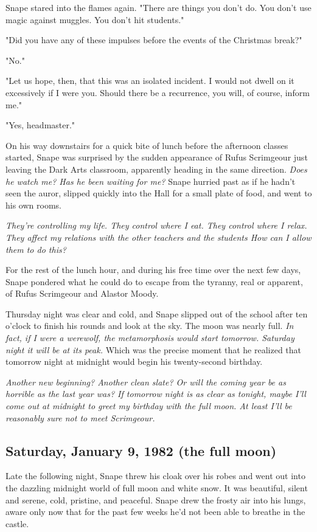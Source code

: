 Snape stared into the flames again. "There are things you don't do. You don't use magic against muggles. You don't hit students."

"Did you have any of these impulses before the{\el} events{\el} of the Christmas break?"

"No."

"Let us hope, then, that this was an isolated incident. I would not dwell on it excessively if I were you. Should there be a recurrence, you will, of course, inform me."

"Yes, headmaster."

On his way downstairs for a quick bite of lunch before the afternoon classes started, Snape was surprised by the sudden appearance of Rufus Scrimgeour just leaving the Dark Arts classroom, apparently heading in the same direction. \emph{Does he watch me? Has he been waiting for me?} Snape hurried past as if he hadn't seen the auror, slipped quickly into the Hall for a small plate of food, and went to his own rooms.

\emph{They're controlling my life. They control where I eat. They control where I relax. They affect my relations with the other teachers and the students{\el} How can I allow them to do this?}

For the rest of the lunch hour, and during his free time over the next few days, Snape pondered what he could do to escape from the tyranny, real or apparent, of Rufus Scrimgeour and Alastor Moody.

Thursday night was clear and cold, and Snape slipped out of the school after ten o'clock to finish his rounds and look at the sky. The moon was nearly full. \emph{In fact, if I were a werewolf, the metamorphosis would start tomorrow. Saturday night it will be at its peak. }Which was the precise moment that he realized that tomorrow night at midnight would begin his twenty-second birthday.

\emph{Another new beginning? Another clean slate? Or will the coming year be as horrible as the last year was? If tomorrow night is as clear as tonight, maybe I'll come out at midnight to greet my birthday with the full moon. At least I'll be reasonably sure not to meet Scrimgeour.}

\subsection{Saturday, January 9, 1982 (the full moon)}

Late the following night, Snape threw his cloak over his robes and went out into the dazzling midnight world of full moon and white snow. It was beautiful, silent and serene, cold, pristine, and peaceful. Snape drew the frosty air into his lungs, aware only now that for the past few weeks he'd not been able to breathe in the castle.

